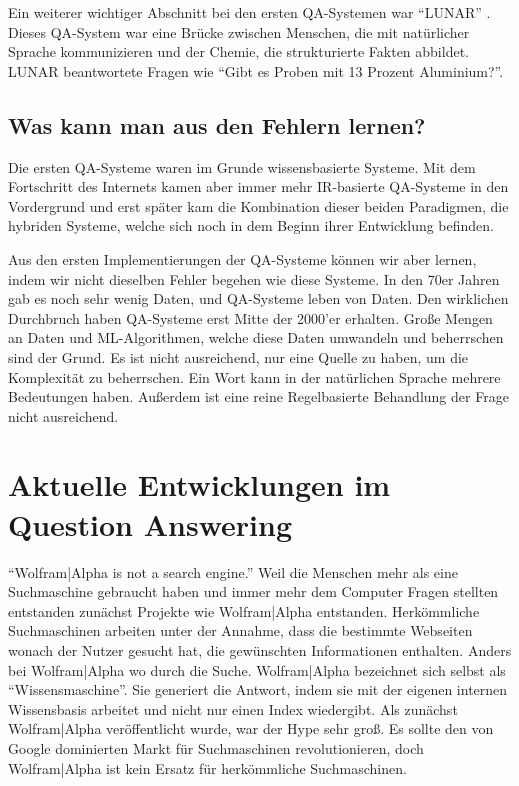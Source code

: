 \documentclass[
        ngerman,
        paper=a4,
        numbers=noendperiod,
]{scrreprt}
\begin{document}
Ein weiterer wichtiger Abschnitt bei den ersten QA-Systemen war \enquote{LUNAR} \citep{Woods1978SemanticsAnswering}. Dieses QA-System war eine Brücke zwischen Menschen, die mit natürlicher Sprache kommunizieren und der Chemie, die strukturierte Fakten abbildet. LUNAR beantwortete  Fragen wie \enquote{Gibt es Proben mit 13 Prozent Aluminium?}. 

\subsection{Was kann man aus den Fehlern lernen?}
Die ersten QA-Systeme waren im Grunde wissensbasierte Systeme. Mit dem Fortschritt des Internets kamen aber immer mehr IR-basierte QA-Systeme in den Vordergrund und erst später kam die Kombination dieser beiden Paradigmen, die hybriden Systeme, welche sich noch in dem Beginn ihrer Entwicklung befinden. 

Aus den ersten Implementierungen der QA-Systeme können wir aber lernen, indem wir nicht dieselben Fehler begehen wie diese Systeme. In den 70er Jahren gab es noch sehr wenig Daten, und QA-Systeme leben von Daten. Den wirklichen Durchbruch haben QA-Systeme erst Mitte der 2000'er erhalten. Große Mengen an Daten und ML-Algorithmen, welche diese Daten umwandeln und beherrschen sind der Grund. Es ist nicht ausreichend, nur eine Quelle zu haben, um die Komplexität zu beherrschen. Ein Wort kann in der natürlichen Sprache mehrere Bedeutungen haben. Außerdem ist eine reine Regelbasierte Behandlung der Frage nicht ausreichend.




\section{Aktuelle Entwicklungen im Question Answering} %

\enquote{Wolfram|Alpha is not a search engine.} \citep{WolframAlpha} Weil die Menschen mehr als eine Suchmaschine gebraucht haben und immer mehr dem Computer Fragen stellten entstanden zunächst Projekte wie Wolfram|Alpha entstanden. Herkömmliche Suchmaschinen arbeiten unter der Annahme, dass die bestimmte Webseiten wonach der Nutzer gesucht hat, die gewünschten Informationen enthalten. Anders bei Wolfram|Alpha wo durch die Suche. Wolfram|Alpha bezeichnet sich selbst als \enquote{Wissensmaschine}. Sie generiert die Antwort, indem sie mit der eigenen internen Wissensbasis arbeitet und nicht nur einen Index wiedergibt. Als zunächst Wolfram|Alpha veröffentlicht wurde, war der Hype sehr groß. Es sollte den von Google dominierten Markt für Suchmaschinen revolutionieren, doch Wolfram|Alpha ist kein Ersatz für herkömmliche Suchmaschinen.
\end{document}
